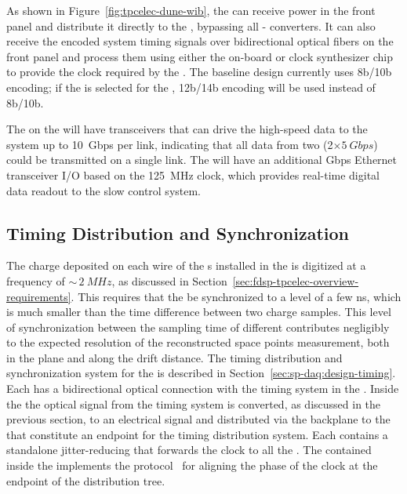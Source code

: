 As shown in Figure~\ref{fig:tpcelec-dune-wib}, the  can 
receive  power in the front panel and distribute it directly 
to the , bypassing all - converters.
It can also receive the encoded system timing signals over bidirectional 
optical fibers on the front panel and process them using either
the on-board  or clock synthesizer chip to provide the 
clock required by the . The baseline  design 
currently uses 8b/10b encoding; if the   
 is selected for the  , 
12b/14b encoding will be used instead of 8b/10b.

The  on the  will have transceivers that can 
drive the high-speed data to the  system up to
\SI{10}{Gbps} per link, indicating that all data from
two  (2$\times\SI{5}{Gbps}$) could be transmitted 
on a single link. The  will have an additional 
Gbps Ethernet transceiver I/O based 
 on the \SI{125}{MHz} clock, which 
provides real-time digital data readout to the slow control system.

\subsection{Timing Distribution and Synchronization}
\label{sec:fdsp-tpcelec-design-timing}

The charge deposited on each wire of the s installed 
in the   is digitized at a frequency of
$\sim\,\SI{2}{MHz}$, as discussed in 
Section~\ref{sec:fdsp-tpcelec-overview-requirements}. This requires
that the  be synchronized to a level of a few ns, which is
much smaller than the time difference between two charge samples.
This level of synchronization between the sampling time of different
 contributes negligibly %
to the expected
resolution %
of the reconstructed space points measurement,
both in the  plane and along the drift distance.
The timing distribution and synchronization system for the %
 is described in Section~\ref{sec:sp-daq:design-timing}.
Each  has a bidirectional optical connection with the
timing system in the . Inside the  the optical
signal from the timing system is converted, as discussed in the previous
section, to an electrical signal and distributed via the backplane to
the  that constitute an endpoint for the timing distribution
system. Each  contains a standalone jitter-reducing  
that %
forwards the clock to all the . The
 contained inside the  implements the 
protocol~\cite{bib:docdb1651,bib:docdb11233}%
for aligning
the phase of the clock at the endpoint of the distribution tree.

